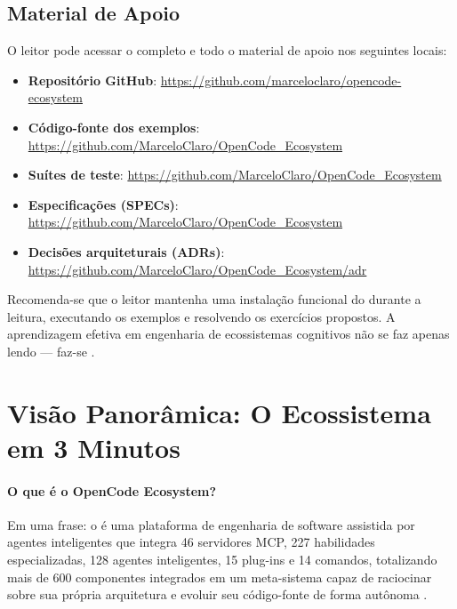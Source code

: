 \subsection{Material de Apoio}

O leitor pode acessar o \opencodeeco{} completo e todo o material de apoio
nos seguintes locais:

\begin{itemize}
  \item \textbf{Repositório GitHub}:
        \url{https://github.com/marceloclaro/opencode-ecosystem}
  \item \textbf{Código-fonte dos exemplos}:
        \url{https://github.com/MarceloClaro/OpenCode_Ecosystem}
  \item \textbf{Suítes de teste}:
        \url{https://github.com/MarceloClaro/OpenCode_Ecosystem}
  \item \textbf{Especificações (SPECs)}:
        \url{https://github.com/MarceloClaro/OpenCode_Ecosystem}
  \item \textbf{Decisões arquiteturais (ADRs)}:
        \url{https://github.com/MarceloClaro/OpenCode_Ecosystem/adr}
\end{itemize}

Recomenda-se que o leitor mantenha uma instalação funcional do
\opencodeeco{} durante a leitura, executando os exemplos e resolvendo os
exercícios propostos. A aprendizagem efetiva em engenharia de ecossistemas
cognitivos não se faz apenas lendo --- faz-se .

\section{Visão Panorâmica: O Ecossistema em 3 Minutos}

\paragraph*{O que é o OpenCode Ecosystem?} Em uma frase: o \opencodeeco{}
é uma plataforma de engenharia de software assistida por agentes
inteligentes que integra 46 servidores MCP, 227 habilidades especializadas,
128 agentes inteligentes, 15 plug-ins e 14 comandos, totalizando mais de
600 componentes integrados em um meta-sistema capaz de raciocinar sobre sua
própria arquitetura e evoluir seu código-fonte de forma autônoma
\cite{opencode2026ecosystem}.

